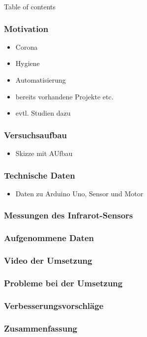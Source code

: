 



\maketitle
\begin{frame}{Table of contents}
\tableofcontents
\end{frame}

\begin{frame}
    \frametitle{Motivation}

    \begin{itemize}
        \item Corona
        \item Hygiene
        \item Automatisierung
        \item bereits vorhandene Projekte etc.
        \item evtl. Studien dazu
    \end{itemize}
\end{frame}

\begin{frame}
    \frametitle{Versuchsaufbau}
  \begin{itemize}
      \item Skizze mit AUfbau
  \end{itemize}
\end{frame}

\begin{frame}
    \frametitle{Technische Daten}
    \begin{itemize}
        \item Daten zu Arduino Uno, Sensor und Motor
    \end{itemize}
\end{frame}

\begin{frame}
    \frametitle{Messungen des Infrarot-Sensors}

\end{frame}

\begin{frame}
    \frametitle{Aufgenommene Daten}
\end{frame}


\begin{frame}
    \frametitle{Video der Umsetzung}
\end{frame}

\begin{frame}
    \frametitle{Probleme bei der Umsetzung}

\end{frame}

\begin{frame}
    \frametitle{Verbesserungsvorschläge}

\end{frame}

\begin{frame}
    \frametitle{Zusammenfassung}

    

\end{frame}

\printbibliography

